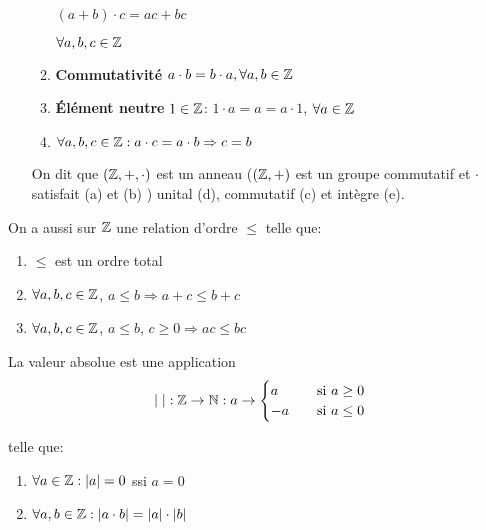 \begin{enumerate}
\begin{enumerate}
\begin{minipage}{.2\textwidth}
				\hspace{0.5cm}$(a+b)\cdot c = ac + bc$\\
			\end{minipage}
			\begin{minipage}{.2\textwidth}
				\hspace{1cm}$\forall a,b,c \in \mathbb{Z}$\\
			\end{minipage}
		\item \textbf{Commutativité} $a \cdot b = b\cdot a, \forall a,b \in \mathbb{Z}$
		\item \textbf{Élément neutre} $1 \in \mathbb{Z}$: $1 \cdot a=a=a \cdot 1$, $\forall a \in \mathbb{Z}$
		\item $\forall a,b,c \in \mathbb{Z}: a\cdot c = a \cdot b \Rightarrow c=b$ \\
	\end{enumerate}
On dit que $(\mathbb{Z},+,\cdot)$ est un anneau ($(\mathbb{Z},+)$ est un groupe commutatif et $\cdot$ satisfait (a) et (b) ) unital (d), commutatif (c) et intègre (e).\\
\end{enumerate}

On a aussi sur $\mathbb{Z}$ une relation d'ordre $\leq$ telle que:

\begin{enumerate}
	\item $\leq$ est un ordre total
	\item $\forall a,b,c \in \mathbb{Z}$, $a\leq b \Rightarrow a+c \leq b+c$
	\item $\forall a,b,c \in \mathbb{Z}$, $a\leq b$, $c\geq 0 \Rightarrow ac\leq bc$\\
\end{enumerate}

La valeur absolue est une application\\

\[ |\;|: \mathbb{Z} \rightarrow \mathbb{N} : a \rightarrow
  \begin{cases}
    a   & \quad \text{si } a\geq 0 \\
    -a  & \quad \text{si } a\leq 0 \\
  \end{cases}
\]

telle que: 

	\begin{enumerate}
		\item $\forall a \in \mathbb{Z}: |a| = 0$ ssi $a=0$
		\item $\forall a,b \in \mathbb{Z}: |a\cdot b| = |a| \cdot |b|$\\
	\end{enumerate}

